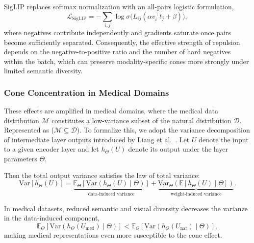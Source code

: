 \documentclass[runningheads]{llncs}
\begin{document}
SigLIP replaces softmax normalization with an all-pairs logistic formulation,
\begin{equation}
\mathcal{L}_{\text{SigLIP}}
=
-\sum_{i,j}\log\sigma\!\big(L_{ij}(\alpha v_i^\top t_j+\beta)\big),
\end{equation}
where negatives contribute independently and gradients saturate once pairs become sufficiently separated. 
Consequently, the effective strength of repulsion depends on the negative-to-positive ratio and the number of hard negatives within the batch, which can preserve modality-specific cones more strongly under limited semantic diversity.



\subsubsection{Cone Concentration in Medical Domains}
\label{sec:medical_specifics}

These effects are amplified in medical domains, where the medical data distribution $\mathcal{M}$ constitutes a low-variance subset of the natural distribution $\mathcal{D}$. Represented as ($\mathcal{M}\subseteq\mathcal{D}$). 
To formalize this, we adopt the variance decomposition of intermediate layer outputs introduced by Liang et al.~\cite{liang2022mind}. 
Let $U$ denote the input to a given encoder layer and let $h_\Theta(U)$ denote its output under the layer parameters $\Theta$. 

Then the total output variance satisfies the law of total variance:
\begin{equation}
\mathrm{Var}\!\left[h_\Theta(U)\right]
=
\underbrace{\mathbb{E}_\Theta\!\left[\mathrm{Var}\!\left(h_\Theta(U)\mid\Theta\right)\right]}_{\text{data-induced variance}}
+
\underbrace{\mathrm{Var}_\Theta\!\left(\mathbb{E}\!\left[h_\Theta(U)\mid\Theta\right]\right)}_{\text{weight-induced variance}}.
\label{eq:total_variance_liang}
\end{equation}

In medical datasets, reduced semantic and visual diversity decreases the varianze in the data-induced component,
\begin{equation}
\mathbb{E}_\Theta\!\left[\mathrm{Var}\!\left(h_\Theta(U_{\text{med}})\mid\Theta\right)\right]
<
\mathbb{E}_\Theta\!\left[\mathrm{Var}\!\left(h_\Theta(U_{\text{nat}})\mid\Theta\right)\right],
\label{eq:data_variance_medical}
\end{equation}
making medical representations even more susceptible to the cone effect. 
\end{document}
